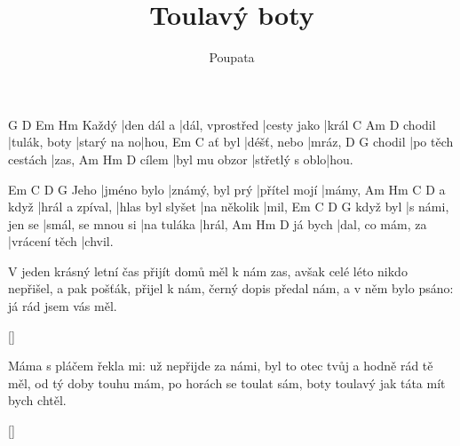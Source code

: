 \documentclass{song}
\title{Toulavý boty}
\author{Poupata}
\begin{document}
\strophe
      G          D               Em          Hm
Každý |den dál a |dál, vprostřed |cesty jako |král
       C            Am          D
chodil |tulák, boty |starý na no|hou,
       Em          C
ať byl |déšť, nebo |mráz,
       D                G
chodil |po těch cestách |zas,
      Am            Hm             D
cílem |byl mu obzor |střetlý s oblo|hou.
\endstrophe

     Em          C               D            G
Jeho |jméno bylo |známý, byl prý |přítel mojí |mámy,
       Am              Hm               C           D
a když |hrál a zpíval, |hlas byl slyšet |na několik |mil,
         Em              C                 D          G
když byl |s námi, jen se |smál, se mnou si |na tuláka |hrál,
        Am               Hm            D
já bych |dal, co mám, za |vrácení těch |chvil.
\endstrophe

\strophe*
V jeden krásný letní čas přijít domů měl k nám zas,
avšak celé léto nikdo nepřišel,
a pak pošťák, přijel k nám,
černý dopis předal nám,
a v něm bylo psáno: já rád jsem vás měl.
\endstrophe

\ref{}

\strophe*
Máma s pláčem řekla mi: už nepřijde za námi,
byl to otec tvůj a hodně rád tě měl,
od tý doby touhu mám,
po horách se toulat sám,
boty toulavý jak táta mít bych chtěl.
\endstrophe

\ref{}
\end{document}
